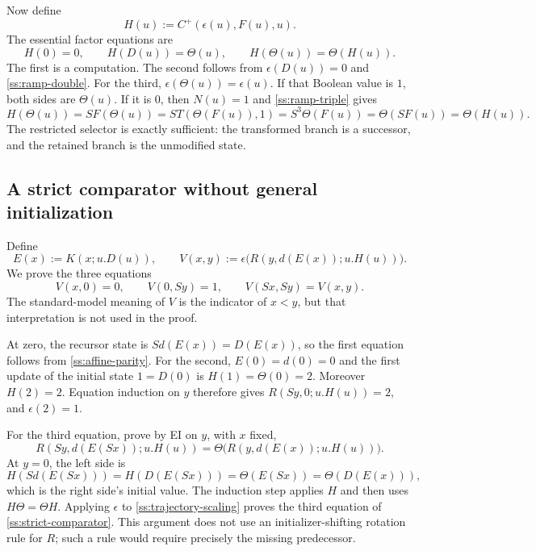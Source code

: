 Now define
\[
                   H(u):=C^+(\epsilon(u),F(u),u).
\]
The essential factor equations are
\begin{equation}
 H(0)=0,\qquad H(D(u))=\Theta(u),\qquad
 H(\Theta(u))=\Theta(H(u)).
 \label{ss:factor-map}
\end{equation}
The first is a computation.  The second follows from
$\epsilon(D(u))=0$ and \eqref{ss:ramp-double}.
For the third, $\epsilon(\Theta(u))=\epsilon(u)$.
If that Boolean value is $1$, both sides are $\Theta(u)$.
If it is $0$, then $N(u)=1$ and \eqref{ss:ramp-triple} gives
\[
 H(\Theta(u))=S F(\Theta(u))
   =S T(\Theta(F(u)),1)
   =S^3\Theta(F(u))
   =\Theta(SF(u))=\Theta(H(u)).
\]
The restricted selector is exactly sufficient: the transformed branch
is a successor, and the retained branch is the unmodified state.

\subsection{A strict comparator without general initialization}

Define
\[
 E(x):=K(x;u.D(u)),\qquad
 V(x,y):=\epsilon\bigl(R(y,d(E(x));u.H(u))\bigr).
\]
We prove the three equations
\begin{equation}
 V(x,0)=0,\qquad V(0,Sy)=1,\qquad
 V(Sx,Sy)=V(x,y).
 \label{ss:strict-comparator}
\end{equation}
The standard-model meaning of $V$ is the indicator of $x<y$, but
that interpretation is not used in the proof.

At zero, the recursor state is $Sd(E(x))=D(E(x))$, so the first
equation follows from \eqref{ss:affine-parity}.
For the second, $E(0)=d(0)=0$ and the first update of the initial
state $1=D(0)$ is $H(1)=\Theta(0)=2$.  Moreover $H(2)=2$.
Equation induction on $y$ therefore gives
$R(Sy,0;u.H(u))=2$, and $\epsilon(2)=1$.

For the third equation, prove by EI on $y$, with $x$ fixed,
\begin{equation}
 R(Sy,d(E(Sx));u.H(u))
     =\Theta\bigl(R(y,d(E(x));u.H(u))\bigr).
 \label{ss:trajectory-scaling}
\end{equation}
At $y=0$, the left side is
\[
 H(Sd(E(Sx)))=H(D(E(Sx)))
   =\Theta(E(Sx))=\Theta(D(E(x))),
\]
which is the right side's initial value.  The induction step applies
$H$ and then uses $H\Theta=\Theta H$.
Applying $\epsilon$ to \eqref{ss:trajectory-scaling} proves the third
equation of \eqref{ss:strict-comparator}.
This argument does not use an initializer-shifting rotation rule for
$R$; such a rule would require precisely the missing predecessor.

